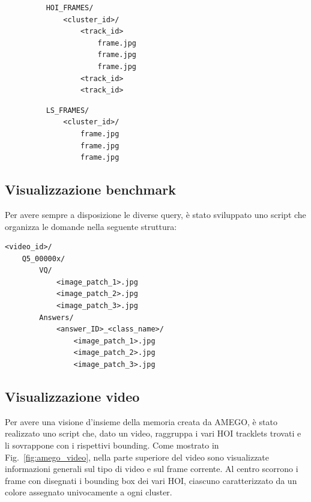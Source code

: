 \begin{figure}[h!]
    \small
    \begin{minipage}[t]{0.44\linewidth}
        \begin{verbatim}
    HOI_FRAMES/
        <cluster_id>/
            <track_id>
                frame.jpg
                frame.jpg
                frame.jpg
            <track_id>
            <track_id>
        \end{verbatim}
    \end{minipage}
    \hfill
    \begin{minipage}[t]{0.44\linewidth}
        \begin{verbatim}
    LS_FRAMES/
        <cluster_id>/
            frame.jpg
            frame.jpg
            frame.jpg
        \end{verbatim}
    \end{minipage}

\end{figure}

\subsection*{Visualizzazione benchmark}
Per avere sempre a disposizione le diverse query, è stato sviluppato uno script che organizza le domande nella seguente struttura:

\begin{verbatim}
<video_id>/
    Q5_00000x/
        VQ/
            <image_patch_1>.jpg
            <image_patch_2>.jpg
            <image_patch_3>.jpg
        Answers/
            <answer_ID>_<class_name>/
                <image_patch_1>.jpg
                <image_patch_2>.jpg
                <image_patch_3>.jpg
\end{verbatim}

\subsection*{Visualizzazione video}

Per avere una visione d'insieme della memoria creata da AMEGO, è stato realizzato uno script che, dato un video, raggruppa i vari HOI tracklets trovati e li sovrappone con i rispettivi bounding.
Come mostrato in Fig.~\ref{fig:amego_video}, nella parte superiore del video sono visualizzate informazioni generali sul tipo di video e sul frame corrente. Al centro scorrono i frame con disegnati i bounding box dei vari HOI, ciascuno caratterizzato da un colore assegnato univocamente a ogni cluster.

